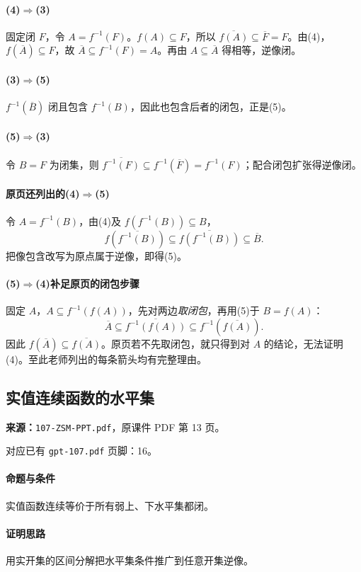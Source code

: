 \paragraph{(4)$\Rightarrow$(3)}固定闭 $F$，令 $A=f^{-1}(F)$。$f(A)\subseteq F$，所以 $\overline{f(A)}\subseteq\overline F=F$。由(4)，$f(\overline A)\subseteq F$，故 $\overline A\subseteq f^{-1}(F)=A$。再由 $A\subseteq\overline A$ 得相等，逆像闭。
\paragraph{(3)$\Rightarrow$(5)}$f^{-1}(\overline B)$ 闭且包含 $f^{-1}(B)$，因此也包含后者的闭包，正是(5)。
\paragraph{(5)$\Rightarrow$(3)}令 $B=F$ 为闭集，则 $\overline{f^{-1}(F)}\subseteq f^{-1}(\overline F)=f^{-1}(F)$；配合闭包扩张得逆像闭。
\paragraph{原页还列出的(4)$\Rightarrow$(5)}令 $A=f^{-1}(B)$，由(4)及 $f(f^{-1}(B))\subseteq B$，
\[f(\overline{f^{-1}(B)})\subseteq\overline{f(f^{-1}(B))}\subseteq\overline B.\]
把像包含改写为原点属于逆像，即得(5)。
\paragraph{(5)$\Rightarrow$(4)补足原页的闭包步骤}固定 $A$，$A\subseteq f^{-1}(f(A))$，先对两边\emph{取闭包}，再用(5)于 $B=f(A)$：
\[\overline A\subseteq\overline{f^{-1}(f(A))}\subseteq f^{-1}(\overline{f(A)}).\]
因此 $f(\overline A)\subseteq\overline{f(A)}$。原页若不先取闭包，就只得到对 $A$ 的结论，无法证明(4)。至此老师列出的每条箭头均有完整理由。

\clearpage\subsection{实值连续函数的水平集}
\textbf{来源：}\texttt{107-ZSM-PPT.pdf}，原课件 PDF 第 13 页。\par
对应已有 \texttt{gpt-107.pdf} 页脚：16。\par
\paragraph{命题与条件}实值函数连续等价于所有弱上、下水平集都闭。
\paragraph{证明思路}用实开集的区间分解把水平集条件推广到任意开集逆像。
